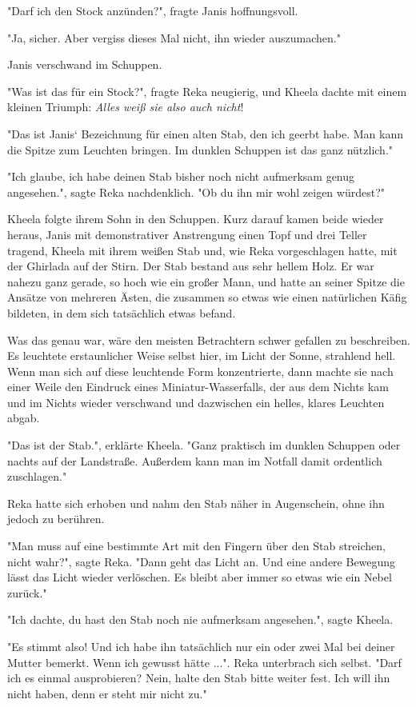 \documentclass[10pt, a4paper, oneside]{book}
\begin{document}
\begin{multicols}{2}
"Darf ich den Stock anzünden?", fragte Janis hoffnungsvoll.

"Ja, sicher. Aber vergiss dieses Mal nicht, ihn wieder auszumachen." 

Janis verschwand im Schuppen.

"Was ist das für ein Stock?", fragte Reka neugierig, und Kheela dachte mit 
einem kleinen Triumph: \textit{Alles weiß sie also auch nicht}!

"Das ist Janis‘ Bezeichnung für einen alten Stab, den ich geerbt habe. Man kann die Spitze zum Leuchten bringen. Im dunklen Schuppen ist das ganz nützlich." 

"Ich glaube, ich habe deinen Stab bisher noch nicht aufmerksam genug 
angesehen.", sagte Reka nachdenklich. "Ob du ihn mir wohl zeigen würdest?" 

Kheela folgte ihrem Sohn in den Schuppen. Kurz darauf kamen beide wieder heraus, Janis mit demonstrativer Anstrengung einen Topf und drei Teller tragend, Kheela mit ihrem weißen Stab und, wie Reka vorgeschlagen hatte, mit der Ghirlada auf der Stirn. Der Stab bestand aus sehr hellem Holz. Er war nahezu ganz gerade, so hoch wie ein großer Mann, und hatte an seiner Spitze die Ansätze von mehreren Ästen, die zusammen so etwas wie einen natürlichen Käfig bildeten, in dem sich tatsächlich etwas befand. 

Was das genau war, wäre den meisten Betrachtern schwer gefallen zu beschreiben. Es leuchtete erstaunlicher Weise selbst hier, im Licht der Sonne, strahlend hell. Wenn man sich auf diese leuchtende Form konzentrierte, dann machte sie nach einer Weile den Eindruck eines Miniatur-Wasserfalls, der aus dem Nichts kam und im Nichts wieder verschwand und dazwischen ein helles, klares Leuchten abgab. 

"Das ist der Stab.", erklärte Kheela. "Ganz praktisch im dunklen Schuppen oder nachts auf der Landstraße. Außerdem kann man im Notfall damit ordentlich zuschlagen." 

Reka hatte sich erhoben und nahm den Stab näher in Augenschein, ohne ihn jedoch zu berühren. 

"Man muss auf eine bestimmte Art mit den Fingern über den Stab streichen, nicht wahr?", sagte Reka. "Dann geht das Licht an. Und eine andere Bewegung lässt das Licht wieder verlöschen. Es bleibt aber immer so etwas wie ein Nebel zurück." 

"Ich dachte, du hast den Stab noch nie aufmerksam angesehen.", sagte Kheela. 

"Es stimmt also! Und ich habe ihn tatsächlich nur ein oder zwei Mal bei deiner Mutter bemerkt. Wenn ich gewusst hätte ...". Reka unterbrach sich selbst. "Darf ich es einmal ausprobieren? Nein, halte den Stab bitte weiter fest. Ich will ihn nicht haben, denn er steht mir nicht zu." 


\end{multicols}
\end{document}
